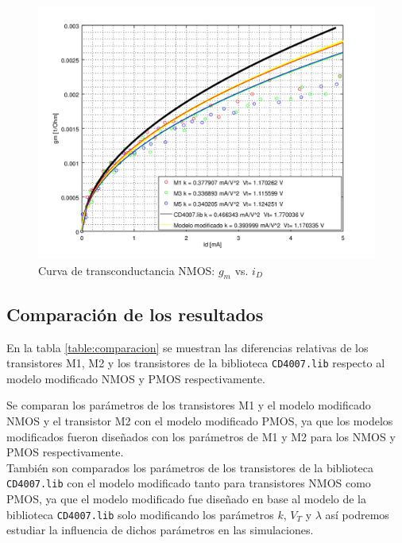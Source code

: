 \documentclass[10pt,spanish,a4paper,openany,notitlepage]{article}
\begin{document}
\begin{figure}[H] %
\begin{center}
\includegraphics[scale=0.65]{./octave/N_GM_ID.png}
\caption{Curva de transconductancia NMOS: $g_m$ vs. $i_D$}
 \label{fig:N_GM_ID}
\end{center}
\end{figure}

\subsection{Comparación de los resultados}

En la tabla \ref{table:comparacion} se muestran las diferencias relativas de los transistores M1, M2 y los transistores de la biblioteca \texttt{CD4007.lib} respecto al modelo modificado NMOS y PMOS respectivamente.

Se comparan los parámetros de los transistores M1 y el modelo modificado  NMOS y el transistor M2 con el modelo modificado PMOS, ya que los modelos modificados fueron diseñados con los parámetros de M1 y M2 para los NMOS y PMOS respectivamente.\\
También son comparados los parámetros de los transistores de la biblioteca \texttt{CD4007.lib} con el modelo modificado tanto para transistores NMOS como PMOS, ya que el modelo modificado fue diseñado en base al modelo de la biblioteca \texttt{CD4007.lib} solo modificando los parámetros $k$, $V_T$ y $\lambda$ así podremos estudiar la influencia de dichos parámetros en las simulaciones.
\end{document}
